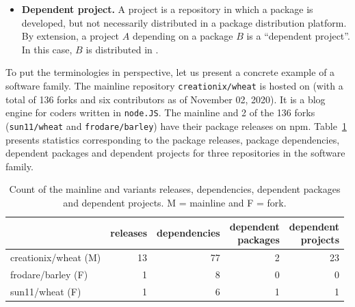 \begin{itemize}
      \item \textbf{Dependent project.} A project is a repository in which a package is developed, but not necessarily distributed in a package distribution platform. By extension, a project $A$ depending on a package $B$ is a ``dependent project''. In this case, $B$ is distributed in \npm.%

\end{itemize}

To put the terminologies in perspective, let us present a concrete example of a software family. 
The mainline repository \texttt{creationix/wheat} is hosted on \gh (with a total of 136 forks and six contributors as of November 02, 2020). 
It is a blog engine for coders written in \texttt{node.JS}. 
The mainline and 2 of the 136 forks (\texttt{sun11/wheat} and \texttt{frodare/barley}) have their package releases on npm.
Table~\ref{tab:example} presents statistics corresponding to the package releases, package dependencies, dependent packages and dependent projects for three repositories in the software family.

\begin{table}[ht]
\begin{center}
\caption{Count of the mainline and variants releases, dependencies, dependent packages and dependent projects. M = mainline and F = fork.}
\label{tab:example}
\begin{tabular}{l r r r r } 
 \hline
 &releases & dependencies & \shortstack{dependent \\ packages} & \shortstack{dependent \\ projects} \\ \hline
 creationix/wheat (M)  &13 & 77 & 2&23 \\ 
 frodare/barley (F)    &1 & 8 & 0 & 0 \\ 
 sun11/wheat (F)       &1 & 6 & 1 & 1 \\ 
 \hline
\end{tabular}
\end{center}
\end{table}

